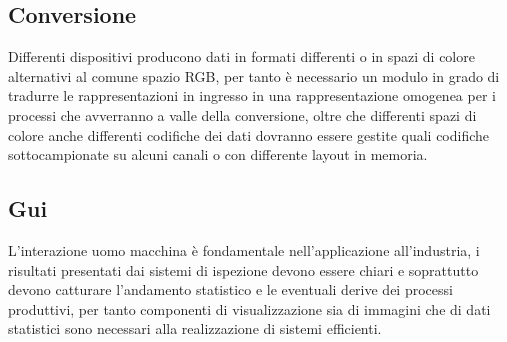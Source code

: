 \subsection{Conversione}
Differenti dispositivi producono dati in formati differenti o  in spazi di colore alternativi al comune spazio RGB, per tanto è necessario un modulo in grado di tradurre le rappresentazioni in ingresso in una rappresentazione omogenea per i processi che avverranno a valle della conversione, oltre che differenti spazi di colore anche differenti codifiche dei dati dovranno essere gestite quali codifiche sottocampionate su alcuni canali o con differente layout in memoria.

\subsection{Gui}
L'interazione uomo macchina è fondamentale nell'applicazione all'industria, i risultati presentati dai sistemi di ispezione devono essere chiari e soprattutto devono catturare l'andamento statistico e le eventuali derive dei processi produttivi, per tanto componenti di visualizzazione sia di immagini che di dati statistici sono necessari alla realizzazione di sistemi efficienti.